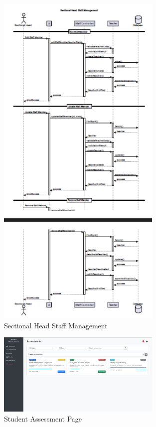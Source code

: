 \documentclass[12pt,a4paper]{report}
\begin{document}
\begin{figure}[htbp]
    \centering
    \includegraphics[width=0.7\textwidth]{sectional-head-staff-management.png}
    \caption{Sectional Head Staff Management}
    \label{fig:sectional-head-staff-management}
\end{figure}

\begin{figure}[htbp]
    \centering
    \includegraphics[width=0.7\textwidth]{student-assessment-page.png}
    \caption{Student Assessment Page}
    \label{fig:student-assessment-page}
\end{figure}
\end{document}

